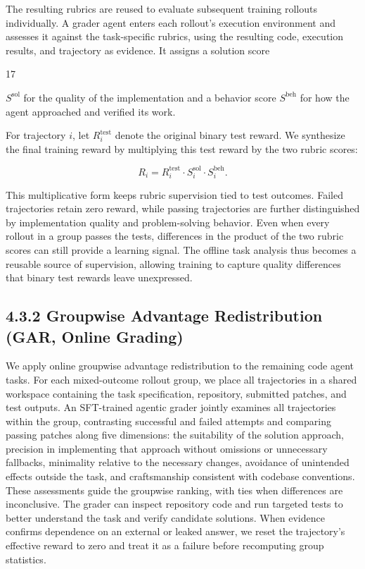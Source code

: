 \documentclass[
  10
]{article}
\begin{document}
The resulting rubrics are reused to evaluate subsequent training
rollouts individually. A grader agent enters each rollout's execution
environment and assesses it against the task-specific rubrics, using the
resulting code, execution results, and trajectory as evidence. It
assigns a solution score

17

\(S ^ { \mathrm { s o l } }\) for the quality of the implementation and
a behavior score \(S ^ { \mathrm { b e h } }\) for how the agent
approached and verified its work.

For trajectory $i$, let \(R _ { i } ^ { \mathrm { t e s t } }\) denote the
original binary test reward. We synthesize the final training reward by
multiplying this test reward by the two rubric scores:

\[
R _ { i } = R _ { i } ^ { \mathrm { t e s t } } \cdot S _ { i } ^ { \mathrm { s o l } } \cdot S _ { i } ^ { \mathrm { b e h } } .\tag{2}
\]

This multiplicative form keeps rubric supervision tied to test outcomes.
Failed trajectories retain zero reward, while passing trajectories are
further distinguished by implementation quality and problem-solving
behavior. Even when every rollout in a group passes the tests,
differences in the product of the two rubric scores can still provide a
learning signal. The offline task analysis thus becomes a reusable source
of supervision, allowing training to capture quality differences that
binary test rewards leave unexpressed.

\subsection{4.3.2 Groupwise Advantage Redistribution (GAR, Online
Grading)}\label{groupwise-advantage-redistribution-gar-online-grading}

We apply online groupwise advantage redistribution to the remaining code
agent tasks. For each mixed-outcome rollout group, we place all
trajectories in a shared workspace containing the task specification,
repository, submitted patches, and test outputs. An SFT-trained agentic
grader jointly examines all trajectories within the group, contrasting
successful and failed attempts and comparing passing patches along five
dimensions: the suitability of the solution approach, precision in
implementing that approach without omissions or unnecessary fallbacks,
minimality relative to the necessary changes, avoidance of unintended
effects outside the task, and craftsmanship consistent with codebase
conventions. These assessments guide the groupwise ranking, with ties
when differences are inconclusive. The grader can inspect repository code
and run targeted tests to better understand the task and verify
candidate solutions. When evidence confirms dependence on an external or
leaked answer, we reset the trajectory's effective reward to zero and
treat it as a failure before recomputing group statistics.
\end{document}
